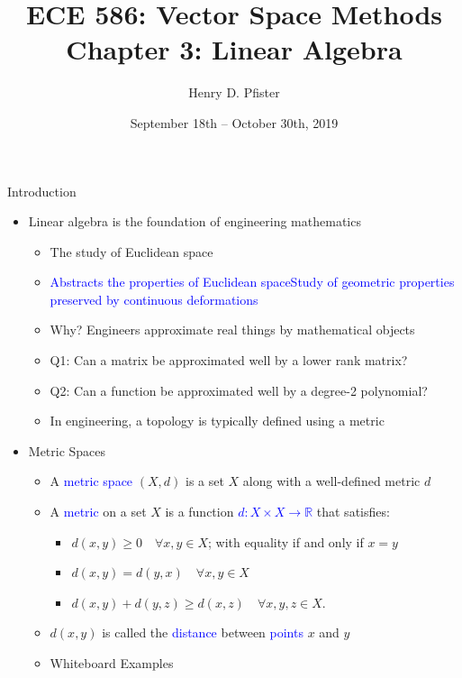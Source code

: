 \documentclass[10pt,letterpaper,english]{beamer}
\newif\ifslow
\begin{document}
\ifslow

\title{ECE 586: Vector Space Methods \\ Chapter 3: Linear Algebra}
\author{Henry D. Pfister \\ \univ}
\date{September 18th -- October 30th, 2019}
\maketitle

\iffalse

\begin{frame}{Introduction}

\begin{itemize}
\setlength\itemsep{3mm}
\item<1-> Linear algebra is the foundation of engineering mathematics \vspace{1mm}
\begin{itemize} 
  \setlength\itemsep{1.5mm}
  \item The study of Euclidean space  
  \item<1-> \textcolor{blue}{Abstracts the properties of Euclidean spaceStudy of geometric properties preserved by continuous deformations}
  \item<2-> Why? Engineers approximate real things by mathematical objects
  \item<2-> Q1: Can a matrix be approximated well by a lower rank matrix?
  \item<2-> Q2: Can a function be approximated well by a degree-2 polynomial?
  \item<2-> In engineering, a topology is typically defined using a metric
\end{itemize}

\vspace{1mm}

\item<3-> Metric Spaces \vspace{1mm}
\begin{itemize} 
  \setlength\itemsep{1.5mm}
  \item A \textcolor{blue}{metric space} $(X,d)$ is a set $X$ along with a well-defined metric $d$
  \item A \textcolor{blue}{metric} on a set $X$ is a function \textcolor{blue}{$d \colon X \times X \rightarrow \mathbb{R} $} that satisfies: \vspace{1mm}
  \begin{itemize}
  \setlength\itemsep{1.5mm}
  \item $d(x,y) \geq 0 \quad \forall x, y \in X$; with equality if and only if $x = y$
  \item $d(x,y) = d(y,x) \quad \forall x, y \in X$
  \item $d(x,y) + d(y,z) \geq d(x,z) \quad \forall x, y, z \in X$.
  \end{itemize}
  \item $d(x,y)$ is called the \textcolor{blue}{distance} between \textcolor{blue}{points} $x$ and $y$
  \item Whiteboard Examples
\end{itemize}
\end{itemize}
\end{frame}
\end{document}
